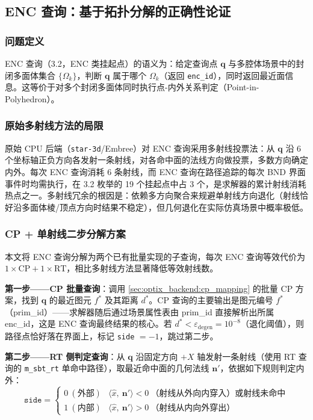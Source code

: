 \subsection{ENC 查询：基于拓扑分解的正确性论证}
\label{sec:optix_backend:enc_mapping}

\subsubsection{问题定义}

ENC 查询（3.2，ENC 类挂起点）的语义为：给定查询点 $\mathbf{q}$ 与多腔体场景中的封闭多面体集合 $\{\Omega_k\}$，判断 $\mathbf{q}$ 属于哪个 $\Omega_k$（返回 \texttt{enc\_id}），同时返回最近面信息。这等价于对多个封闭多面体同时执行点-内外关系判定（Point-in-Polyhedron）。

\subsubsection{原始多射线方法的局限}

原始 CPU 后端（\texttt{star-3d}/Embree）对 ENC 查询采用多射线投票法：从 $\mathbf{q}$ 沿 6 个坐标轴正负方向各发射一条射线，对各命中面的法线方向做投票，多数方向确定内外。每次 ENC 查询消耗 6 条射线，而 ENC 查询在路径追踪的每次 BND 界面事件时均需执行，在 3.2 枚举的 19 个挂起点中占 3 个，是求解器的累计射线消耗热点之一。多射线冗余的根因是：依赖多方向聚合来规避单射线方向退化（射线恰好沿多面体棱/顶点方向时结果不稳定），但几何退化在实际仿真场景中概率极低。

\subsubsection{CP + 单射线二步分解方案}

本文将 ENC 查询分解为两个已有批量实现的子查询，每次 ENC 查询等效代价为 $1 \times \text{CP} + 1 \times \text{RT}$，相比多射线方法显著降低等效射线数。

\textbf{第一步——CP 批量查询}：调用 \ref{sec:optix_backend:cp_mapping} 的批量 CP 方案，找到 $\mathbf{q}$ 的最近图元 $f^*$ 及其距离 $d^*$。CP 查询的主要输出是图元编号 $f^*$（prim\_id）——求解器随后通过场景属性表由 prim\_id 直接解析出所属 enc\_id，这是 ENC 查询最终结果的核心。若 $d^* < \varepsilon_{\text{degen}} = 10^{-8}$（退化阈值），则路径点恰好落在界面上，标记 \texttt{side} $= -1$，跳过第二步。

\textbf{第二步——RT 侧判定查询}：从 $\mathbf{q}$ 沿固定方向 $+X$ 轴发射一条射线（使用 RT 查询的 \texttt{m\_sbt\_rt} 单命中路径），取最近命中面的几何法线 $\mathbf{n}'$，依据如下规则判定内外：
\begin{equation}
  \texttt{side} = \begin{cases}
    0\ (\text{外部}) & \langle \hat{x},\ \mathbf{n}' \rangle < 0\ \text{（射线从外向内穿入）或射线未命中} \\
    1\ (\text{内部}) & \langle \hat{x},\ \mathbf{n}' \rangle > 0\ \text{（射线从内向外穿出）}
  \end{cases}
\end{equation}

